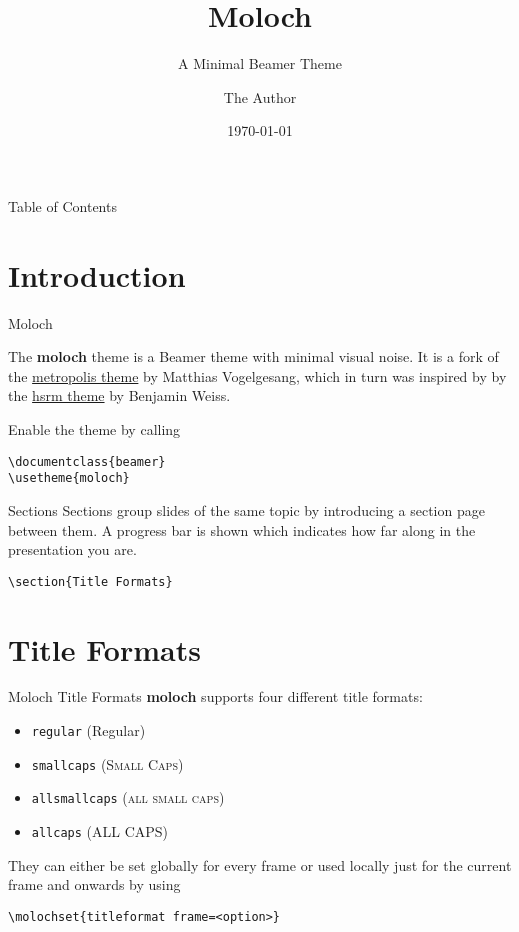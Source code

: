 \documentclass[10pt]{beamer}
\title{Moloch}
\subtitle{A Minimal Beamer Theme}
\date{\today}
\author{The Author}
\institute{Some Institution, Some University}
\newcommand{\themename}{\textbf{moloch}\xspace}
\begin{document}
\maketitle

\begin{frame}{Table of Contents}
  \tableofcontents[hideallsubsections]
\end{frame}

\section{Introduction}

\begin{frame}[fragile]{Moloch}

  The \themename theme is a Beamer theme with minimal visual noise. It is a fork of the
  \href{https://github.com/matze/mtheme}{metropolis theme} by Matthias Vogelgesang, which in
  turn was inspired by by the \href{https://github.com/hsrmbeamertheme/hsrmbeamertheme}{hsrm
    theme} by Benjamin Weiss. \medskip

  Enable the theme by calling
  \begin{verbatim}\documentclass{beamer}
\usetheme{moloch}\end{verbatim}
\end{frame}
\begin{frame}[fragile]{Sections}
  Sections group slides of the same topic by introducing a section page between them. A progress bar is shown which indicates how far along in the presentation you are.

  \begin{verbatim}\section{Title Formats}\end{verbatim}
\end{frame}

\section{Title Formats}

\begin{frame}[fragile]{Moloch Title Formats}
  \themename supports four different title formats:
  \begin{itemize}
    \item \texttt{regular} (Regular)
    \item \texttt{smallcaps} (\textsc{Small Caps})
    \item \texttt{allsmallcaps} (\textsc{all small caps})
    \item \texttt{allcaps} (ALL CAPS)
  \end{itemize}

  They can either be set globally for every frame or used locally just for the current frame
  and onwards by using
  \begin{verbatim}\molochset{titleformat frame=<option>}\end{verbatim}
\end{frame}
\end{document}
